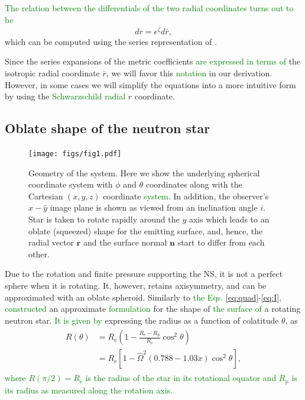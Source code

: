 \documentclass{aa}
\newcommand{\be}{\begin{equation}}
\newcommand{\ee}{\end{equation}}
\renewcommand{\vec}[1]{\ensuremath{\boldsymbol{#1}}}
\newcommand{\refe}[1]{\textcolor{green}{{#1}}}
\newcommand{\refedel}[1]{}
\newcommand{\Req}{\ensuremath{R_{\mathrm{e}}}}
\newcommand{\sch}{Schwarzschild }
\newcommand{\rb}{\ensuremath{\bar{r}}}
\newcommand{\Ob}{\ensuremath{\hat{\Omega}}}
\newcommand{\zetab}{\ensuremath{\bar{\zeta}}}
\begin{document}
\refe{The relation between the differentials of the two radial coordinates turns out to be}
\be\label{eq:drb2dr}
dr = e^{\zetab} d\rb,
\ee
which can be computed using the series representation of \cite{BI76}.

Since the series expansions of the metric coefficients \refe{are expressed in terms of} the isotropic radial coordinate $\rb$, we will favor this \refe{notation} in our derivation.  
However, in some cases we will simplify the equations into a more intuitive form by using the \refe{\sch radial} $r$ coordinate.


\subsection{Oblate shape of the neutron star}\label{sect:oblate}

\begin{figure}
\centering
\texttt{[image: figs/fig1.pdf]}
\caption{\label{fig:geom}
Geometry of the system. Here we show the underlying spherical coordinate system with $\phi$ and $\theta$ coordinates along with the Cartesian $(x,y,z)$ coordinate \refe{system}.
In addition, the observer's $\hat{x}-\hat{y}$ image plane is shown as viewed from an inclination angle $i$.
Star is taken to rotate rapidly around the $y$ axis which leads to an oblate (squeezed) shape for the emitting surface, and, hence, the radial vector $\vec{r}$ and the surface normal $\vec{n}$ start to differ from each other.
}
\end{figure}

Due to the rotation and finite pressure supporting the NS, it is not a perfect sphere when it is rotating.  
It, however, retains axisymmetry, and can be approximated with an oblate spheroid.  
Similarly to \refe{the Eqs. \eqref{eq:quad}-\eqref{eq:I},} \citet{aGM14} \refedel{derived}\refe{constructed} an approximate \refe{formulation} for the shape of \refe{the surface of} a rotating neutron star. 
\refe{It is given by} expressing the radius as a function of colatitude $\theta$, as 
\begin{align}\begin{split}\label{eq:radf}
    R(\theta) &= \Req \left( 1 - \frac{\Req - R_{\mathrm{p}}}{\Req} \cos^2\theta \right) \\
              &= \Req [1-\Ob^2 (0.788 - 1.03x) \cos^2 \theta],
\end{split}\end{align}
\refe{where $R(\pi/2) = \Req$ is the radius of the star in its rotational equator and $R_{\mathrm{p}}$ is its radius as measured along the rotation axis.}
\end{document}
